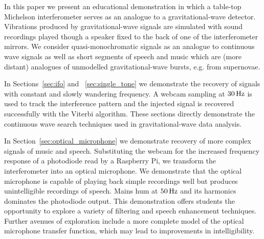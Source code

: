 \documentclass[paper-main.tex]{subfiles}
\begin{document}

In this paper we present an educational demonstration in which a table-top Michelson interferometer serves as an analogue to a gravitational-wave detector. 
Vibrations produced by gravitational-wave signals are simulated with sound recordings played though a speaker fixed to the back of one of the interferometer mirrors. 
We consider quasi-monochromatic signals as an analogue to continuous wave signals as well as short segments of speech and music which are (more distant) analogues of unmodelled gravitational-wave bursts, e.g. from supernovae. 


In Sections~\ref{sec:ifo} and ~\ref{sec:single_tone} we demonstrate the recovery of signals with constant and slowly wandering frequency. 
A webcam sampling at $30\,{\rm Hz}$ is used to track the interference pattern and the injected signal is recovered successfully with the Viterbi algorithm. 
These sections directly demonstrate the continuous wave search techniques used in gravitational-wave data analysis. 


In Section~\ref{sec:optical_microphone} we demonstrate recovery of more complex signals of music and speech. 
Substituting the webcam for the increased frequency response of a photodiode read by a Raspberry Pi, we transform the interferometer into an optical microphone.
We demonstrate that the optical microphone is capable of playing back simple recordings well but produces unintelligible recordings of speech. 
Mains hum at $50\,{\rm Hz}$ and its harmonics dominates the photodiode output. 
This demonstration offers students the opportunity to explore a variety of filtering and speech enhancement techniques. 
Further avenues of exploration include a more complete model of the optical microphone transfer function, which may lead to improvements in intelligibility. 
\end{document}

